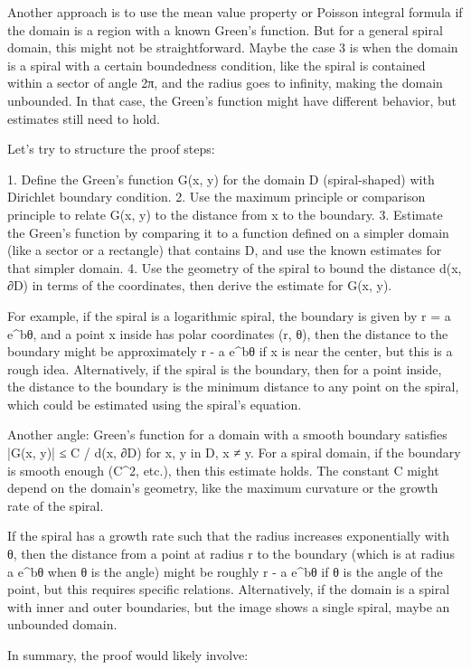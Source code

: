 Another approach is to use the mean value property or Poisson integral formula if the domain is a region with a known Green's function. But for a general spiral domain, this might not be straightforward. Maybe the case 3 is when the domain is a spiral with a certain boundedness condition, like the spiral is contained within a sector of angle 2π, and the radius goes to infinity, making the domain unbounded. In that case, the Green's function might have different behavior, but estimates still need to hold.

Let's try to structure the proof steps:

1. Define the Green's function G(x, y) for the domain D (spiral-shaped) with Dirichlet boundary condition.
2. Use the maximum principle or comparison principle to relate G(x, y) to the distance from x to the boundary.
3. Estimate the Green's function by comparing it to a function defined on a simpler domain (like a sector or a rectangle) that contains D, and use the known estimates for that simpler domain.
4. Use the geometry of the spiral to bound the distance d(x, ∂D) in terms of the coordinates, then derive the estimate for G(x, y).

For example, if the spiral is a logarithmic spiral, the boundary is given by r = a e^{bθ}, and a point x inside has polar coordinates (r, θ), then the distance to the boundary might be approximately r - a e^{bθ} if x is near the center, but this is a rough idea. Alternatively, if the spiral is the boundary, then for a point inside, the distance to the boundary is the minimum distance to any point on the spiral, which could be estimated using the spiral's equation.

Another angle: Green's function for a domain with a smooth boundary satisfies |G(x, y)| ≤ C / d(x, ∂D) for x, y in D, x ≠ y. For a spiral domain, if the boundary is smooth enough (C^2, etc.), then this estimate holds. The constant C might depend on the domain's geometry, like the maximum curvature or the growth rate of the spiral.

If the spiral has a growth rate such that the radius increases exponentially with θ, then the distance from a point at radius r to the boundary (which is at radius a e^{bθ} when θ is the angle) might be roughly r - a e^{bθ} if θ is the angle of the point, but this requires specific relations. Alternatively, if the domain is a spiral with inner and outer boundaries, but the image shows a single spiral, maybe an unbounded domain.

In summary, the proof would likely involve:

